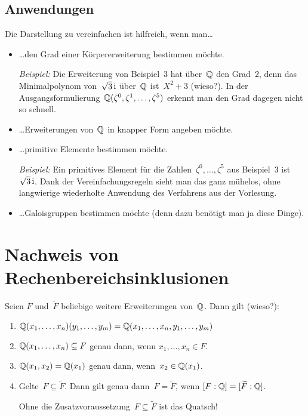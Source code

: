 \documentclass{../../algblatt}
\begin{document}
\subsection*{Anwendungen}

Die Darstellung zu vereinfachen ist hilfreich, wenn man\ldots
\begin{itemize}
\item \ldots den Grad einer Körpererweiterung bestimmen
möchte.

\emph{Beispiel:} Die Erweiterung von Beispiel~3 hat über~$\mathbb{Q}$ den Grad~2, denn das
Minimalpolynom von~$\sqrt{3}\,\mathrm{i}$ über~$\mathbb{Q}$ ist~$X^2 + 3$ (wieso?). In der
Ausgangsformulierung~$\mathbb{Q}(\zeta^0,\zeta^1,\ldots,\zeta^5)$ erkennt man den Grad
dagegen nicht so schnell.

\item \ldots Erweiterungen von~$\mathbb{Q}$ in knapper Form angeben möchte.

\item \ldots primitive Elemente bestimmen möchte.

\emph{Beispiel:} Ein primitives Element für die Zahlen~$\zeta^0,\ldots,\zeta^5$
aus Beispiel~3 ist~$\sqrt{3}\,\mathrm{i}$. Dank der Vereinfachungsregeln sieht man das ganz
mühelos, ohne langwierige wiederholte Anwendung des Verfahrens aus der
Vorlesung.

\item \ldots Galoisgruppen bestimmen möchte (denn dazu benötigt man ja diese
Dinge).
\end{itemize}


\section*{Nachweis von Rechenbereichsinklusionen}

Seien $F$ und~$\widetilde F$ beliebige weitere Erweiterungen von~$\mathbb{Q}$. Dann
gilt (wieso?):

\begin{enumerate}
\item $\mathbb{Q}(x_1,\ldots,x_n)(y_1,\ldots,y_m) = \mathbb{Q}(x_1,\ldots,x_n,y_1,\ldots,y_m)$
\item $\mathbb{Q}(x_1,\ldots,x_n) \subseteq F$ genau dann, wenn
$x_1,\ldots,x_n \in F$.
\item $\mathbb{Q}(x_1,x_2) = \mathbb{Q}(x_1)$ genau dann, wenn~$x_2 \in \mathbb{Q}(x_1)$.
\item Gelte~$F \subseteq \widetilde F$. Dann gilt genau dann~$F =
\widetilde F$, wenn $[F:\mathbb{Q}] = [\widetilde F:\mathbb{Q}]$.

Ohne die Zusatzvoraussetzung~$F \subseteq \widetilde F$ ist das Quatsch!
\end{enumerate}
\end{document}
